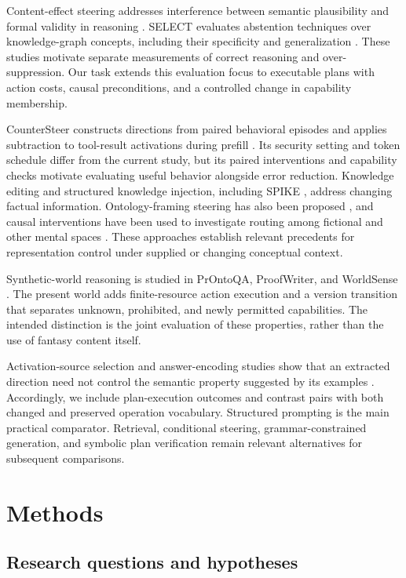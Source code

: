 \documentclass[preprint,12pt,numbers,nopreprintline]{elsarticle}
\begin{document}
Content-effect steering addresses interference between semantic plausibility and formal validity in reasoning \citep{ref5}. SELECT evaluates abstention techniques over knowledge-graph concepts, including their specificity and generalization \citep{ref6}. These studies motivate separate measurements of correct reasoning and over-suppression. Our task extends this evaluation focus to executable plans with action costs, causal preconditions, and a controlled change in capability membership.

CounterSteer constructs directions from paired behavioral episodes and applies subtraction to tool-result activations during prefill \citep{ref7}. Its security setting and token schedule differ from the current study, but its paired interventions and capability checks motivate evaluating useful behavior alongside error reduction. Knowledge editing \citep{ref8} and structured knowledge injection, including SPIKE \citep{ref9}, address changing factual information. Ontology-framing steering has also been proposed \citep{ref10}, and causal interventions have been used to investigate routing among fictional and other mental spaces \citep{ref11}. These approaches establish relevant precedents for representation control under supplied or changing conceptual context.

Synthetic-world reasoning is studied in PrOntoQA, ProofWriter, and WorldSense \citep{ref12,ref13,ref14}. The present world adds finite-resource action execution and a version transition that separates unknown, prohibited, and newly permitted capabilities. The intended distinction is the joint evaluation of these properties, rather than the use of fantasy content itself.

Activation-source selection and answer-encoding studies show that an extracted direction need not control the semantic property suggested by its examples \citep{ref15,ref16}. Accordingly, we include plan-execution outcomes and contrast pairs with both changed and preserved operation vocabulary. Structured prompting is the main practical comparator. Retrieval, conditional steering, grammar-constrained generation, and symbolic plan verification remain relevant alternatives for subsequent comparisons.

\section{Methods}

\subsection{Research questions and hypotheses}
\end{document}
